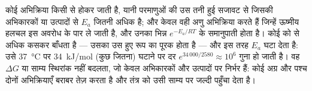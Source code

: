\begin{proposition}[एंजाइम क्या बदलता है और क्या नहीं]\label{prop:b1:enzymes:whatitdoes}
कोई अभिक्रिया किसी \emph{} से होकर जाती है, यानी परमाणुओं
की उस तनी हुई सजावट से जिसकी  अभिकारकों या उत्पादों से
\emph{} $E_a$ जितनी अधिक है; और केवल वही अणु अभिक्रिया करते
हैं जिन्हें ऊष्मीय हलचल इस अवरोध के पार ले जाती है, और उनका भिन्न
$e^{-E_a/RT}$ के समानुपाती होता है। कोई   को
 से अधिक कसकर बाँधता है --- उसका  उस  हुए रूप का
पूरक होता है --- और इस तरह $E_a$ घटा देता है: उसे \qty{37}{\celsius} पर
\qty{34}{kJ/mol} (कुछ  जितना) घटाने पर दर
$e^{34\,000/2580} \approx
10^6$ गुना हो जाती है। वह $\Delta G$ या साम्य स्थिरांक नहीं बदलता, जो
केवल अभिकारकों और उत्पादों पर निर्भर हैं: कोई  अग्र और पश्च दोनों
अभिक्रियाएँ बराबर तेज़ करता है और तंत्र को उसी साम्य पर जल्दी पहुँचा देता
है।
\end{proposition}

